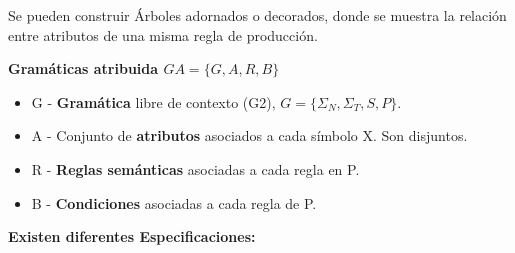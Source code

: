 \documentclass[12pt, twoside, openright]{report} %
\begin{document}
Se pueden construir Árboles adornados o decorados, donde se muestra la relación entre atributos de una misma regla de producción.

\textbf{Gramáticas atribuida $GA=\{G,A,R,B\}$}
\begin{itemize}
	\item G - \textbf{Gramática} libre de contexto (G2), $G = \{\Sigma_N, \Sigma_T, S, P\}$.
	\item A - Conjunto de \textbf{atributos} asociados a cada símbolo X. Son disjuntos.
	\item R - \textbf{Reglas semánticas} asociadas a cada regla en P.
	\item B - \textbf{Condiciones} asociadas a cada regla de P.
\end{itemize}

\textbf{Existen diferentes Especificaciones:}
\end{document}

